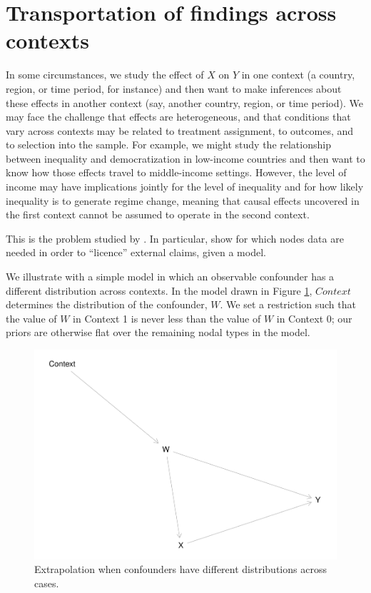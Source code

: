 \documentclass[
  12pt,
]{book}
\begin{document}
\hypertarget{transportation-of-findings-across-contexts}{%
\section{Transportation of findings across contexts}\label{transportation-of-findings-across-contexts}}

In some circumstances, we study the effect of \(X\) on \(Y\) in one context (a country, region, or time period, for instance) and then want to make inferences about these effects in another context (say, another country, region, or time period). We may face the challenge that effects are heterogeneous, and that conditions that vary across contexts may be related to treatment assignment, to outcomes, and to selection into the sample. For example, we might study the relationship between inequality and democratization in low-income countries and then want to know how those effects travel to middle-income settings. However, the level of income may have implications jointly for the level of inequality and for how likely inequality is to generate regime change, meaning that causal effects uncovered in the first context cannot be assumed to operate in the second context.

This is the problem studied by \citet{pearl2014external}. In particular, \citet{pearl2014external} show for which nodes data are needed in order to ``licence'' external claims, given a model.

We illustrate with a simple model in which an observable confounder has a different distribution across contexts. In the model drawn in Figure \ref{fig:extval}, \(Context\) determines the distribution of the confounder, \(W\). We set a restriction such that the value of \(W\) in Context 1 is never less than the value of \(W\) in Context 0; our priors are otherwise flat over the remaining nodal types in the model.

\begin{figure}

{\centering \includegraphics{ii_files/figure-latex/extval-1} 

}

\caption{Extrapolation when confounders have different distributions across cases.}\label{fig:extval}
\end{figure}
\end{document}
